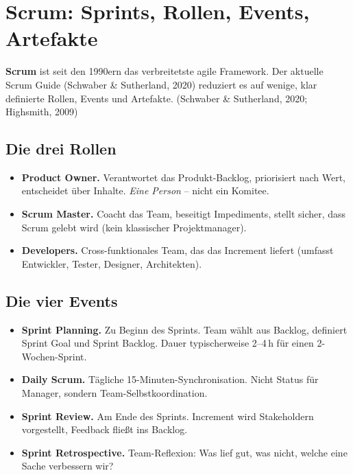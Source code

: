 \documentclass[11pt,a4paper,oneside]{article}
\newcommand{\fachbegriff}[1]{\textbf{#1}}
\newcommand{\quelle}[1]{{\footnotesize\color{lpGray}(#1)}}
\begin{document}
\section{Scrum: Sprints, Rollen, Events, Artefakte}

\fachbegriff{Scrum} ist seit den 1990ern das verbreitetste agile Framework. Der aktuelle Scrum Guide (Schwaber \& Sutherland, 2020) reduziert es auf wenige, klar definierte Rollen, Events und Artefakte. \quelle{Schwaber \& Sutherland, 2020; Highsmith, 2009}

\subsection{Die drei Rollen}

\begin{itemize}
  \item \fachbegriff{Product Owner.} Verantwortet das Produkt-Backlog, priorisiert nach Wert, entscheidet über Inhalte. \emph{Eine Person} -- nicht ein Komitee.
  \item \fachbegriff{Scrum Master.} Coacht das Team, beseitigt Impediments, stellt sicher, dass Scrum gelebt wird (kein klassischer Projektmanager).
  \item \fachbegriff{Developers.} Cross-funktionales Team, das das Increment liefert (umfasst Entwickler, Tester, Designer, Architekten).
\end{itemize}

\subsection{Die vier Events}

\begin{itemize}
  \item \fachbegriff{Sprint Planning.} Zu Beginn des Sprints. Team wählt aus Backlog, definiert Sprint Goal und Sprint Backlog. Dauer typischerweise 2--4\,h für einen 2-Wochen-Sprint.
  \item \fachbegriff{Daily Scrum.} Tägliche 15-Minuten-Synchronisation. Nicht Status für Manager, sondern Team-Selbstkoordination.
  \item \fachbegriff{Sprint Review.} Am Ende des Sprints. Increment wird Stakeholdern vorgestellt, Feedback fließt ins Backlog.
  \item \fachbegriff{Sprint Retrospective.} Team-Reflexion: Was lief gut, was nicht, welche eine Sache verbessern wir?
\end{itemize}
\end{document}
